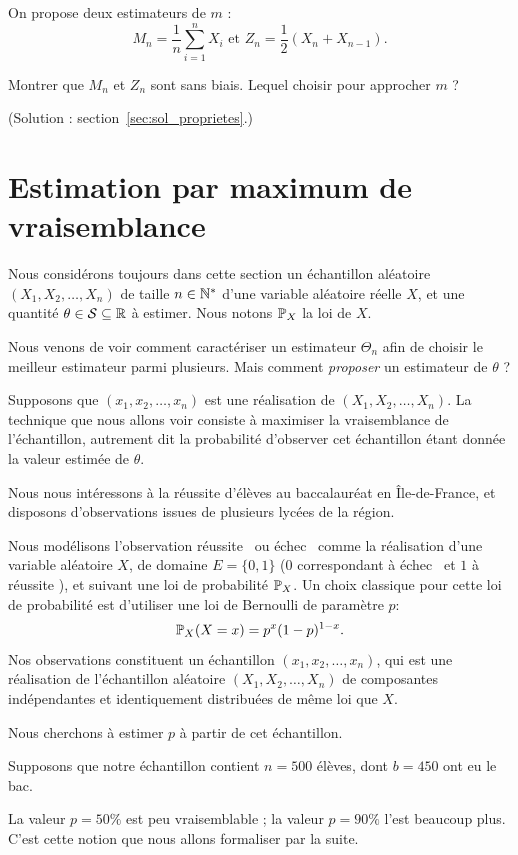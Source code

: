 On propose deux estimateurs de $m$ : 
\[
  M_n = \frac1n \sum_{i=1}^n X_i \text{ et } Z_n = \frac12 (X_n + X_{n-1}).
\]

Montrer que $M_n$ et $Z_n$ sont sans biais. Lequel choisir pour approcher $m$ ?

(Solution : section~\ref{sec:sol_proprietes}.)






\section{Estimation par maximum de vraisemblance}
Nous considérons toujours dans cette section un échantillon aléatoire
$(X_1, X_2, \dots, X_n)$ de taille $n \in \mathbb{N}^*$ d'une variable aléatoire
réelle $X$, et une quantité $\theta \in \mathcal{S} \subseteq \mathbb{R}$ à estimer. Nous
notons $\mathbb{P}_X$ la loi de $X$.

Nous venons de voir comment caractériser un estimateur $\Theta_n$ afin de
choisir le meilleur estimateur parmi plusieurs. Mais comment \textit{proposer} un
estimateur de $\theta$ ?

Supposons que $(x_1, x_2, \dots, x_n)$ est une réalisation de
$(X_1, X_2, \dots, X_n)$. La technique que nous allons voir consiste à
maximiser la vraisemblance de l'échantillon, autrement dit la probabilité
d'observer cet échantillon étant donnée la valeur estimée de $\theta$.

\begin{exemple}
  Nous nous intéressons à la réussite d'élèves au baccalauréat en
  \^Ile-de-France, et disposons d'observations issues de plusieurs lycées de la
  région.

  Nous modélisons l'observation \og réussite \fg~ou \og échec \fg~comme la
  réalisation d'une variable aléatoire $X$, de domaine $E = \{0, 1\}$ ($0$
  correspondant à \og échec \fg~et $1$ à \og réussite \fg), et suivant une loi
  de probabilité $\mathbb{P}_X$.  Un choix classique pour cette loi de probabilité est
  d'utiliser une loi de Bernoulli de paramètre $p$:
  \[
    \mathbb{P}_X(X=x) = p^x (1-p)^{1-x}.
  \] 
  Nos observations constituent un échantillon
  $(x_1, x_2, \dots, x_n)$, qui est une réalisation de l'échantillon aléatoire
  $(X_1, X_2, \dots, X_n)$ de composantes indépendantes et identiquement
  distribuées de même loi que $X$.

  Nous cherchons à estimer $p$ à partir de cet échantillon. 

  Supposons que notre échantillon contient $n=500$ élèves, dont $b=450$ ont
  eu le bac.

  La valeur $p=50\%$ est peu vraisemblable ; la valeur $p=90\%$ l'est beaucoup
  plus. C'est cette notion que nous allons formaliser par la suite.
\end{exemple}

